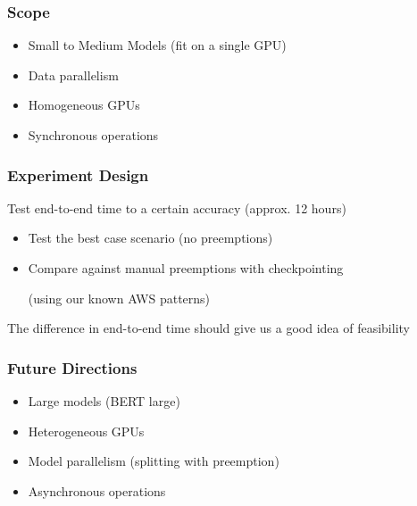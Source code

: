   \begin{frame}
    \frametitle{Scope}

    \begin{itemize}
      \item Small to Medium Models (fit on a single GPU)
      \item Data parallelism
      \item Homogeneous GPUs
      \item Synchronous operations
    \end{itemize}
  \end{frame}

  \begin{frame}
    \frametitle{Experiment Design}

    Test end-to-end time to a certain accuracy (approx. 12 hours)

    \begin{itemize}
      \item Test the best case scenario (no preemptions)
      \item Compare against manual preemptions with checkpointing

            (using our known AWS patterns)
    \end{itemize}

    \vspace{2em}

    The difference in end-to-end time should give us a good idea of feasibility
  \end{frame}

  \begin{frame}
    \frametitle{Future Directions}

    \begin{itemize}
      \item Large models (BERT large)
      \item Heterogeneous GPUs
      \item Model parallelism (splitting with preemption)
      \item Asynchronous operations
    \end{itemize}
  \end{frame}



